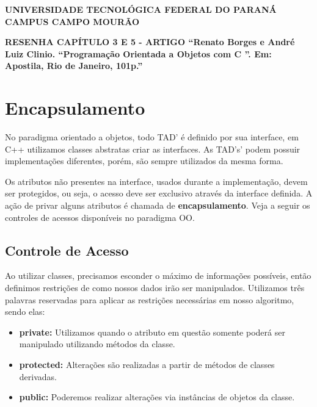 \documentclass[a4paper, 12pt]{article}
\def\Cplusplus{C\raisebox{0.5ex}{\tiny\textbf{++}} }
\begin{document}
	
	\hspace{5cm}
	
	\begin{large}
		\begin{center}
			\textbf{UNIVERSIDADE TECNOLÓGICA FEDERAL DO PARANÁ}\newline
			\textbf{CAMPUS CAMPO MOURÃO}
		\end{center}
	\end{large}
	
	\vspace{0.5cm}
	
	\begin{center}
		\textbf{RESENHA CAPÍTULO 3 E 5 - ARTIGO ``Renato Borges e André Luiz Clinio. ``Programação Orientada a Objetos com \Cplusplus''. Em: Apostila, Rio de Janeiro, 101p.''}
	\end{center}

	\vspace{0.5cm}
	
	\section{Encapsulamento}
	\onehalfspacing
	
	No paradigma orientado a objetos, todo TAD' é definido por sua interface, em C++ utilizamos classes abstratas criar as interfaces. As TAD's' podem possuir implementações diferentes, porém, são sempre utilizados da mesma forma.
	
	Os atributos não presentes na interface, usados durante a implementação, devem ser protegidos, ou seja, o acesso deve ser exclusivo através da interface definida. A ação de privar alguns atributos é chamada de \textbf{encapsulamento}. Veja a seguir os controles de acessos disponíveis no paradigma OO.
	
	\subsection{Controle de Acesso}
	
	Ao utilizar classes, precisamos esconder o máximo de informações possíveis, então definimos restrições de como nossos dados irão ser manipulados. Utilizamos três palavras reservadas para aplicar as restrições necessárias em nosso algoritmo, sendo elas:
	
	\begin{itemize}
		\item \textbf{private:} Utilizamos quando o atributo em questão somente poderá ser manipulado utilizando métodos da classe.
		
		\item \textbf{protected:} Alterações são realizadas a partir de métodos de classes derivadas.
		
		\item \textbf{public:} Poderemos realizar alterações via instâncias de objetos da classe.
	\end{itemize}
\end{document}
